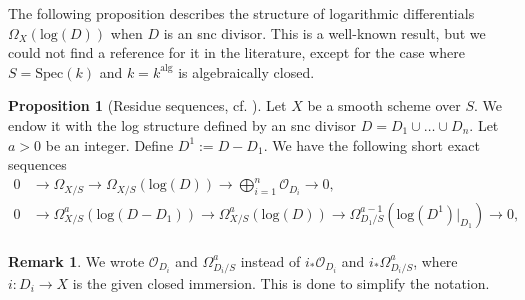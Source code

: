 \documentclass{amsart}
\def\Spec{\textrm{Spec}}
\theoremstyle{definition}
\newtheorem{proposition}[theorem]{Proposition}
\newtheorem{remark}[theorem]{Remark}
\numberwithin{equation}{section}
\begin{document}
The following proposition describes the structure of logarithmic differentials $\Omega_X(\textrm{log}(D))$ when $D$ is an snc divisor. This is a well-known result, but we could not find a reference for it in the literature, except for the case where $S=\Spec(k)$ and $k=k^{\textrm{alg}}$ is algebraically closed. 
\begin{proposition}[{Residue sequences, cf. \cite[Properties 2.3]{Esnault}}]\label{ResidueSequences}
	Let $X$ be a smooth scheme over $S$. We endow it with the log structure defined by an snc divisor $D=D_1\cup \dots \cup D_n$. Let $a>0$ be an integer. Define $D^1:=D-D_1$. We have the following short exact sequences 
	\begin{equation*}
	\begin{aligned}
		0 &\to \Omega_{X/S} \to \Omega_{X/S}(\textrm{log}(D)) \to \bigoplus_{i=1}^n\mathcal{O}_{D_i} \to 0,\\
		0 &\to \Omega^a_{X/S}(\textrm{log}(D - D_1)) \to \Omega^a_{X/S}(\textrm{log}(D)) \to \Omega_{D_1/S}^{a-1}(\textrm{log}(D^1)|_{D_1}) \to 0,\\
	\end{aligned}
	\end{equation*}
\end{proposition}
\begin{remark}
	We wrote $\mathcal{O}_{D_i}$ and $\Omega_{D_i/S}^{a}$ instead of $i_*\mathcal{O}_{D_i}$ and $i_*\Omega_{D_i/S}^{a}$, where $i:D_i\to X$ is the given closed immersion. This is done to simplify the notation.
\end{remark}
\end{document}
